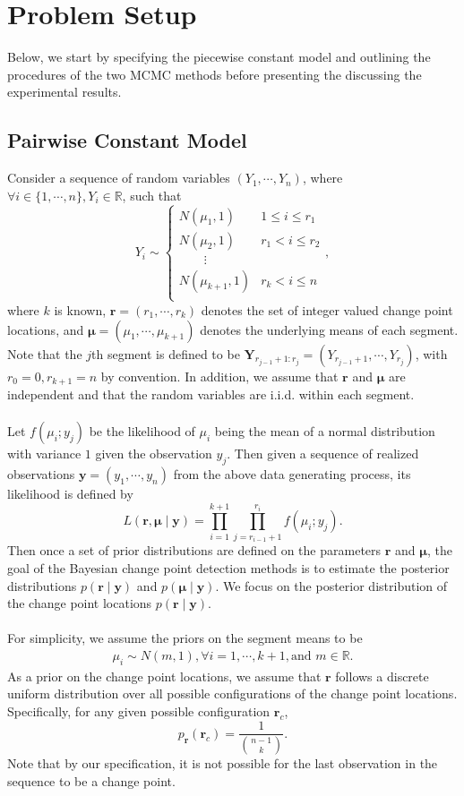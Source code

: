 

\section{Problem Setup}\label{sec:prob}
Below, we start by specifying the piecewise constant model and outlining the procedures of the two MCMC methods before presenting the discussing the experimental results.
\subsection{Pairwise Constant Model}
Consider a sequence of random variables $(Y_1,\cdots,Y_n)$, where $\forall i \in \{1,\cdots,n\}, Y_i \in \mathbb{R}$, such that
\[
Y_i \sim \begin{cases}
N(\mu_1,1) & 1 \leq i \leq r_1 \\
N(\mu_2,1) & r_1 < i \leq r_2 \\
\quad \quad \vdots \\
N(\mu_{k+1},1) & r_k < i \leq n \\
\end{cases},
\]
where $k$ is known, $\bm{r} = (r_1,\cdots,r_k)$ denotes the set of integer valued change point locations, and $\bm{\mu} = (\mu_1,\cdots,\mu_{k+1})$ denotes the underlying means of each segment. Note that the $j$th segment is defined to be $\bm{Y}_{r_{j-1}+1 : r_j} = (Y_{r_{j-1}+1}, \cdots, Y_{r_j})$, with $r_0 = 0, r_{k+1} = n$ by convention. In addition, we assume that $\bm{r}$ and $\bm{\mu}$ are independent and that the random variables are i.i.d. within each segment.\\\\
Let $f(\mu_i; y_j)$ be the likelihood of $\mu_i$ being the mean of a normal distribution with variance $1$ given the observation $y_j$. Then given a sequence of realized observations $\bm{y} = (y_1,\cdots,y_n)$ from the above data generating process, its likelihood is defined by
\[
L( \bm{r}, \bm{\mu} \mid \bm{y} ) = \prod_{i=1}^{k+1}\prod_{j=r_{i-1}+1}^{r_i} f(\mu_i; y_j).
\]
Then once a set of prior distributions are defined on the parameters $\bm{r}$ and $\bm{\mu}$, the goal of the Bayesian change point detection methods is to estimate the posterior distributions $p(\bm{r} \mid \bm{y})$ and $p(\bm{\mu} \mid \bm{y})$. We focus on the posterior distribution of the change point locations $p(\bm{r} \mid \bm{y})$.\\\\
For simplicity, we assume the priors on the segment means to be
\begin{align}\label{eqn:prior}
\mu_i \sim N(m, 1), \forall i=1,\cdots,k+1, \text{and } m\in \mathbb{R}.
\end{align}
As a prior on the change point locations, we assume that $\bm{r}$ follows a discrete uniform distribution over all possible configurations of the change point locations. Specifically, for any given possible configuration $\bm{r}_c$,
\[
p_{\bm{r}}(\bm{r}_c) = \frac{1}{\binom{n-1}{k}}.
\]
Note that by our specification, it is not possible for the last observation in the sequence to be a change point.

